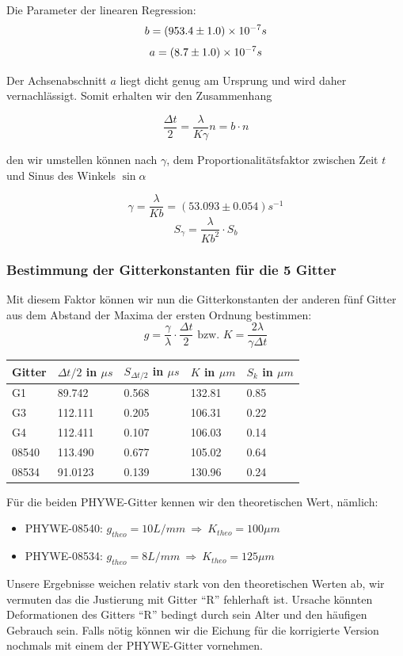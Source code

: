 Die Parameter der linearen Regression:
$$ b               = (953.4 \pm 1.0)\times 10^{-7} s $$
$$ a               = (8.7 \pm 1.0)\times 10^{-7} s $$

Der Achsenabschnitt $a$ liegt dicht genug am Ursprung und wird daher vernachlässigt. Somit erhalten wir den Zusammenhang

$$\frac{\Delta t}{2} = \frac{\lambda}{K\gamma}n = b\cdot n$$

den wir umstellen können nach $\gamma$, dem Proportionalitätsfaktor zwischen Zeit $t$ und Sinus des Winkels $\sin \alpha$ 

$$ \gamma = \frac{\lambda}{Kb} = (53.093 \pm 0.054) s^{-1} $$
$$S_{\gamma} = \frac{\lambda}{Kb^2} \cdot S_b $$


\subsubsection{Bestimmung der Gitterkonstanten f\"ur die 5 Gitter}

Mit diesem Faktor können wir nun die Gitterkonstanten der anderen fünf Gitter aus dem Abstand der Maxima der ersten Ordnung bestimmen:
$$ g = \frac{\gamma}{\lambda}\cdot \frac{\Delta t}{2} \text{ bzw. } K = \frac{2 \lambda }{\gamma \Delta t} $$
\begin{center}
\begin{tabular}{lllll}
\toprule 
Gitter & $\Delta t /2$ in $\mu s$ & $S_{\Delta t /2}$ in $\mu s$ & $K$ in $\mu m$ & $S_k$ in $\mu m$\\
\midrule
G1 & 89.742 & 0.568 & 132.81 & 0.85\\
G3 & 112.111 & 0.205 & 106.31 & 0.22\\
G4 & 112.411 & 0.107 & 106.03 & 0.14\\
08540 & 113.490 & 0.677 & 105.02 & 0.64\\
08534 & 91.0123 & 0.139 & 130.96 & 0.24\\
\bottomrule
\end{tabular} 
\end{center}

F\"ur die beiden PHYWE-Gitter kennen wir den theoretischen Wert, n\"amlich: 
\begin{itemize}
\item PHYWE-08540: $g_{theo} = 10 L/mm\ \Rightarrow \ K_{theo} = 100 \mu m$ 
\item PHYWE-08534: $g_{theo} = 8 L/mm\ \Rightarrow \ K_{theo} = 125 \mu m$
\end{itemize} 
Unsere Ergebnisse weichen relativ stark von den theoretischen Werten ab, wir vermuten das die Justierung mit Gitter ``R'' fehlerhaft ist. Ursache könnten Deformationen des Gitters ``R'' bedingt durch sein Alter und den häufigen Gebrauch sein. Falls nötig können wir die Eichung für die korrigierte Version nochmals mit einem der PHYWE-Gitter vornehmen.

